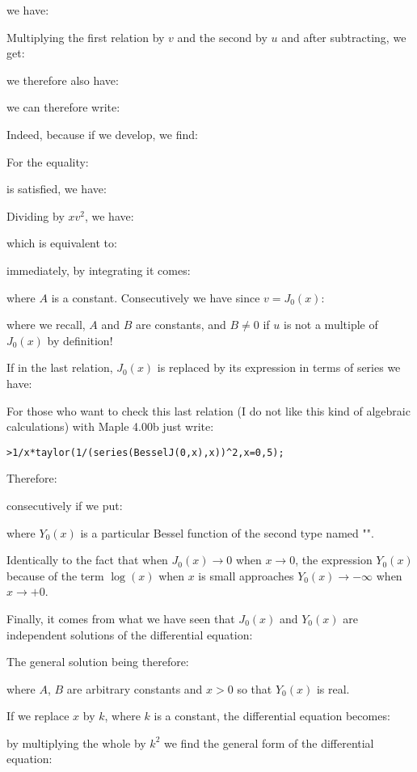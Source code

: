	we have:
	
	Multiplying the first relation by $v$ and the second by $u$ and after subtracting, we get:
	
	we therefore also have:
	
	we can therefore write:
	
	Indeed, because if we develop, we find:
	
	For the equality:
	
	is satisfied, we have:
	
	Dividing by $xv^2$, we have:
	
	which is equivalent to:
	
	immediately, by integrating it comes:
	
	where $A$ is a constant. Consecutively we have since $v=J_0(x)$:
	
	where we recall, $A$ and $B$ are constants, and $B\neq 0$ if $u$ is not a multiple of $J_0(x)$ by definition!
	
	If in the last relation, $J_0(x)$ is replaced by its expression in terms of series we have:
	
		For those who want to check this last relation (I do not like this kind of algebraic calculations) with Maple 4.00b just write:
	
	\texttt{>1/x*taylor(1/(series(BesselJ(0,x),x))\string^2,x=0,5);}
	
	Therefore:
	
	consecutively if we put:
	
	where $Y_0(x)$ is a particular Bessel function of the second type named "".

	Identically to the fact that when $J_0(x)\rightarrow 0$ when $x \rightarrow 0$, the expression $Y_0(x)$ because of the term $\log(x)$ when $x$ is small approaches $Y_0(x) \rightarrow -\infty$ when $x\rightarrow +0$.
	
	Finally, it comes from what we have seen that $J_0(x)$ and $Y_0(x)$ are independent solutions of the differential equation:
	
	The general solution being therefore:
	
	where $A$, $B$ are arbitrary constants and $x>0$ so that $Y_0(x)$ is real.

	If we replace $x$ by $k$, where $k$ is a constant, the differential equation becomes:
	
	by multiplying the whole by $k^2$ we find the general form of the differential equation:
	

